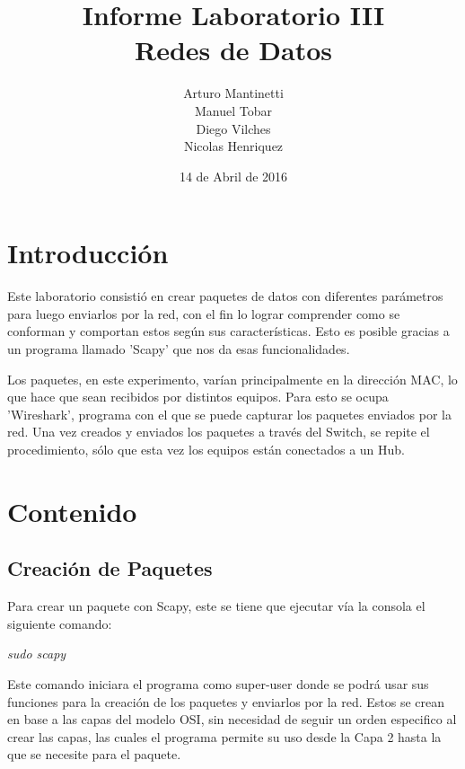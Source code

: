 \documentclass[spanish]{udpreport}
\title{Informe Laboratorio III \\ Redes de Datos}
\author{Arturo Mantinetti \\ Manuel Tobar \\ Diego Vilches \\ Nicolas Henriquez}
\date{14 de Abril de 2016}
\begin{document}
\maketitle

\tableofcontents

\chapter{Introducción}

Este laboratorio consistió en crear paquetes de datos con diferentes parámetros para luego enviarlos por la red, con el fin lo lograr comprender como se conforman y comportan estos según sus características. Esto es posible gracias a un programa llamado 'Scapy' que nos da esas funcionalidades. 

Los paquetes, en este experimento, varían principalmente en la dirección MAC, lo que hace que sean recibidos por distintos equipos. Para esto se ocupa 'Wireshark', programa con el que se puede capturar los paquetes enviados por la red.  Una vez creados y enviados los paquetes a través del Switch, se repite el procedimiento, sólo que esta vez los equipos están conectados a un Hub. 



\chapter{Contenido}

\section{Creación de Paquetes}
Para crear un paquete con Scapy, este se tiene que ejecutar vía la consola el siguiente comando:

\begin{center}
	\emph{sudo scapy}
\end{center}

Este comando iniciara el programa como super-user donde se podrá usar sus funciones para la creación de los paquetes y enviarlos por la red. Estos se crean en base a las capas del modelo OSI, sin necesidad de seguir un orden especifico al crear las capas, las cuales el programa permite su uso desde la Capa 2 hasta la que se necesite para el paquete.
\end{document}
